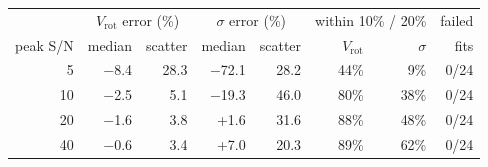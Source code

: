 \begin{tabular}{r rr rr rr r}
\toprule
 & \multicolumn{2}{c}{$V_\mathrm{rot}$ error (\%)} & \multicolumn{2}{c}{$\sigma$ error (\%)} & \multicolumn{2}{c}{within 10\% / 20\%} & failed \\
peak S/N & median & scatter & median & scatter & $V_\mathrm{rot}$ & $\sigma$ & fits \\
\midrule
5 & $-$8.4 & 28.3 & $-$72.1 & 28.2 & 44\% & 9\% & 0/24 \\
10 & $-$2.5 & 5.1 & $-$19.3 & 46.0 & 80\% & 38\% & 0/24 \\
20 & $-$1.6 & 3.8 & +1.6 & 31.6 & 88\% & 48\% & 0/24 \\
40 & $-$0.6 & 3.4 & +7.0 & 20.3 & 89\% & 62\% & 0/24 \\
\bottomrule
\end{tabular}
